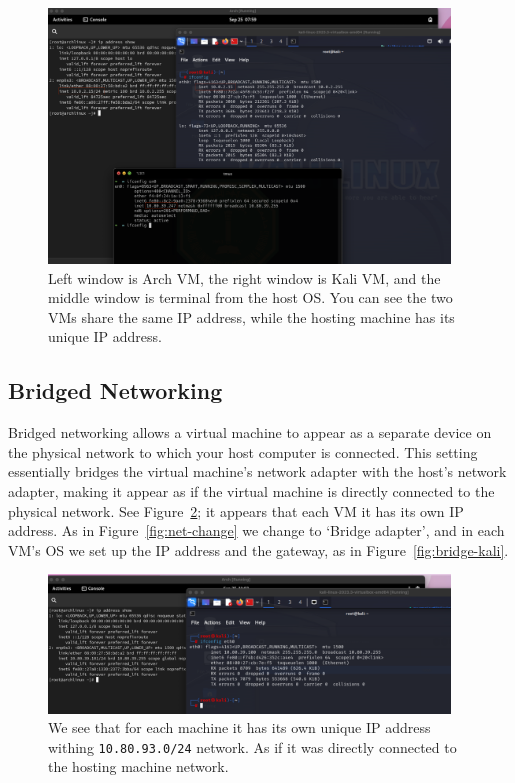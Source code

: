 \documentclass{article}
\def\c#1{\texttt{#1}}
\begin{document}
\begin{figure}[ht]
	\begin{center}
		\includegraphics[width=0.95\textwidth]{figures/NAT-set.png}
	\end{center}
	\caption{Left window is Arch VM, the right window is Kali VM, and the middle window is terminal from the host OS. You can see the two VMs share the same IP address, while the hosting machine has its unique IP address.}
	\label{fig:nat-set}
\end{figure}

\subsection{Bridged Networking}
Bridged networking allows a virtual machine to appear as a separate device on the physical network to which your host computer is connected. This setting essentially bridges the virtual machine's network adapter with the host's network adapter, making it appear as if the virtual machine is directly connected to the physical network. See Figure~\ref{fig:bridge-section}; it appears that each VM it has its own IP address. As in Figure~\ref{fig:net-change} we change to `Bridge adapter', and in each VM's OS we set up the IP address and the gateway, as in Figure~\ref{fig:bridge-kali}.

\begin{figure}[ht]
	\begin{center}
		\includegraphics[width=0.95\textwidth]{figures/bridge-set.png}
	\end{center}
	\caption{We see that for each machine it has its own unique IP address withing \c{10.80.93.0/24} network. As if it was directly connected to the hosting machine network.}
	\label{fig:bridge-section}
\end{figure}
\end{document}
